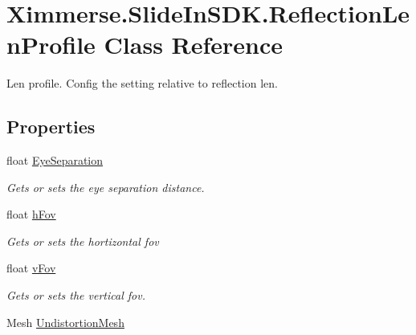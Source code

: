 \hypertarget{class_ximmerse_1_1_slide_in_s_d_k_1_1_reflection_len_profile}{}\section{Ximmerse.\+Slide\+In\+S\+D\+K.\+Reflection\+Len\+Profile Class Reference}
\label{class_ximmerse_1_1_slide_in_s_d_k_1_1_reflection_len_profile}


Len profile. Config the setting relative to reflection len.  


\subsection*{Properties}
\begin{DoxyCompactItemize}
\item 
float \mbox{\hyperlink{class_ximmerse_1_1_slide_in_s_d_k_1_1_reflection_len_profile_aa46dac3b35e3cd3f3526df2893d6f4f2}{Eye\+Separation}}
\begin{DoxyCompactList}\small\item\em Gets or sets the eye separation distance. \end{DoxyCompactList}\item 
float \mbox{\hyperlink{class_ximmerse_1_1_slide_in_s_d_k_1_1_reflection_len_profile_a32824f7bb00cdf69f6322dabdf76dd0b}{h\+Fov}}
\begin{DoxyCompactList}\small\item\em Gets or sets the hortizontal fov \end{DoxyCompactList}\item 
float \mbox{\hyperlink{class_ximmerse_1_1_slide_in_s_d_k_1_1_reflection_len_profile_a9dc5f6ec4fd34ea1daf643c08e780f3d}{v\+Fov}}
\begin{DoxyCompactList}\small\item\em Gets or sets the vertical fov. \end{DoxyCompactList}\item 
Mesh \mbox{\hyperlink{class_ximmerse_1_1_slide_in_s_d_k_1_1_reflection_len_profile_ae23a0043a04be0829819d37a29f760b2}{Undistortion\+Mesh}}

\end{DoxyCompactItemize}
